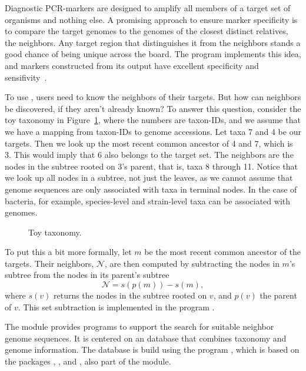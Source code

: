 Diagnostic PCR-markers are designed to amplify all members of a target
set of organisms and nothing else. A promising approach to ensure
marker specificity is to compare the target genomes to the genomes of
the closest distinct relatives, the neighbors. Any target region that
distinguishes it from the neighbors stands a good chance of being
unique across the board. The program  implements this idea,
and markers constructed from its output have excellent specificity and
sensifivity~\cite{hau21:fur}.

To use , users need to know the neighbors of their
targets. But how can neighbors be discovered, if they aren't already
known? To answer this question, consider the toy taxonomy in
Figure~\ref{fig:tax}, where the numbers are taxon-IDs, and we assume
that we have a mapping from taxon-IDs to genome accessions. Let taxa 7
and 4 be our targets. Then we look up the most recent common ancestor
of 4 and 7, which is 3. This would imply that 6 also belongs to the
target set. The neighbors are the nodes in the subtree rooted on 3's
parent, that is, taxa 8 through 11. Notice that we look up all nodes
in a subtree, not just the leaves, as we cannot assume that genome
sequences are only associated with taxa in terminal nodes. In the case
of bacteria, for example, species-level and strain-level taxa can be
associated with genomes.

\begin{figure}
\begin{center}

\end{center}
\caption{Toy taxonomy.}\label{fig:tax}
\end{figure}

To put this a bit more formally, let $m$ be the most recent common
ancestor of the targets. Their neighbors, $\mathcal{N}$, are then
computed by subtracting the nodes in $m$'s subtree from the nodes in
its parent's subtree
\begin{equation}\label{eq:nei}
\mathcal{N} = s(p(m)) - s(m),
\end{equation}
where $s(v)$ returns the nodes in the subtree rooted on $v$, and
$p(v)$ the parent of $v$. This set subtraction is implemented in the
program .

The module  provides programs to support the search for
suitable neighbor genome sequences. It is centered on an 
database that combines taxonomy and genome information. The database
is build using the program , which is based on the
packages , , and , also part of the module.

